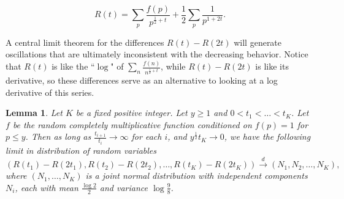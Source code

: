 \documentclass[12pt]{amsart}
\newtheorem{lemma}[theorem]{Lemma}
\theoremstyle{remark}
\theoremstyle{definition}
\theoremstyle{remark}
\numberwithin{equation}{section}
\begin{document}
\begin{equation}\label{eqn: R}
R(t) = \sum_{p} \frac{f(p)}{p^{\frac{1}{2}+t}} + \frac{1}{2}\sum_{p} \frac{1}{p^{1+2t}}.   
\end{equation}

A central limit theorem for the differences $R(t)-R(2t)$ will generate oscillations that are ultimately inconsistent with the decreasing behavior. Notice that $R(t)$ is like the ``$\log$" of $\sum_n \frac{f(n)}{n^{\frac{1}{2}+t}}$, while $R(t)-R(2t)$ is like its derivative, so these differences serve as an alternative to looking at a log derivative of this series.




\begin{lemma} \label{centrallimit}
Let $K$ be a fixed positive integer. Let $y \ge 1$ and $0 < t_1<\dots<t_K$. Let $f$ be the random completely multiplicative function conditioned on $f(p) = 1$ for $p \le y$. Then as long as $\frac{t_{i+1}}{t_i}\rightarrow \infty$ for each $i$, and $y^{\frac{1}{2}}t_K \rightarrow 0$, we have the following limit in distribution of random variables
$$
\left( R(t_1)-R(2t_1), R(t_2)-R(2t_2), \dots, R(t_{K})- R(2t_{K}) \right) \xrightarrow{d} (N_1, N_2, \dots, N_K),
$$
where $(N_1,\dots,N_K)$ is a joint normal distribution with independent components $N_i$, each with mean $\frac{\log 2}{2}$ and variance $\log \frac{9}{8}$.
\end{lemma}
\end{document}
